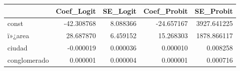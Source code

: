 \begin{tabular}{lrrrr}
\toprule
 & Coef_Logit & SE_Logit & Coef_Probit & SE_Probit \\
\midrule
const & -42.308768 & 8.088366 & -24.657167 & 3927.641225 \\
ï»¿area & 28.687870 & 6.459152 & 15.268303 & 1878.866117 \\
ciudad & -0.000019 & 0.000036 & 0.000010 & 0.008258 \\
conglomerado & 0.000001 & 0.000004 & 0.000001 & 0.000716 \\
\bottomrule
\end{tabular}
